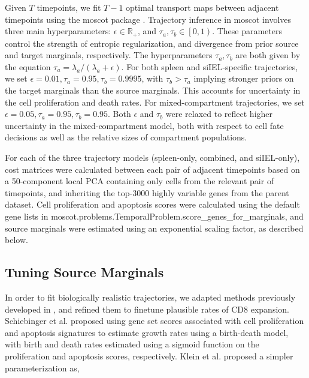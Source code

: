 Given \(T\) timepoints, we fit \(T - 1\) optimal transport maps between adjacent timepoints using the moscot package \citep{kleinMappingCellsTime2025}. Trajectory inference in moscot involves three main hyperparameters: \(\epsilon \in \mathbb{R}_{+}\), and \(\tau_{a},\tau_{b} \in \left\lbrack 0,1 \right)\). These parameters control the strength of entropic regularization, and divergence from prior source and target marginals, respectively. The hyperparameters \(\tau_{a},\tau_{b}\) are both given by the equation \(\tau_{a} = \lambda_{a}/(\lambda_{a} + \epsilon)\). For both spleen and siIEL-specific trajectories, we set \(\epsilon = 0.01,\tau_{a} = 0.95,\tau_{b} = 0.9995\), with \(\tau_{b} > \tau_{a}\) implying stronger priors on the target marginals than the source marginals. This accounts for uncertainty in the cell proliferation and death rates. For mixed-compartment trajectories, we set \(\epsilon = 0.05,\tau_{a} = 0.95,\tau_{b} = 0.95\). Both \(\epsilon\) and \(\tau_{b}\) were relaxed to reflect higher uncertainty in the mixed-compartment model, both with respect to cell fate decisions as well as the relative sizes of compartment populations.

For each of the three trajectory models (spleen-only, combined, and siIEL-only), cost matrices were calculated between each pair of adjacent timepoints based on a 50-component local PCA containing only cells from the relevant pair of timepoints, and inheriting the top-3000 highly variable genes from the parent dataset. Cell proliferation and apoptosis scores were calculated using the default gene lists in moscot.problems.TemporalProblem.score\_genes\_for\_marginals, and source marginals were estimated using an exponential scaling factor, as described below.

\subsection{Tuning Source Marginals}

In order to fit biologically realistic trajectories, we adapted methods previously developed in \citep{schiebingerOptimalTransportAnalysisSingleCell2019, kleinMappingCellsTime2025}, and refined them to finetune plausible rates of CD8 expansion. Schiebinger et al. proposed using gene set scores associated with cell proliferation and apoptosis signatures to estimate growth rates using a birth-death model, with birth and death rates estimated using a sigmoid function on the proliferation and apoptosis scores, respectively. Klein et al. proposed a simpler parameterization as,

